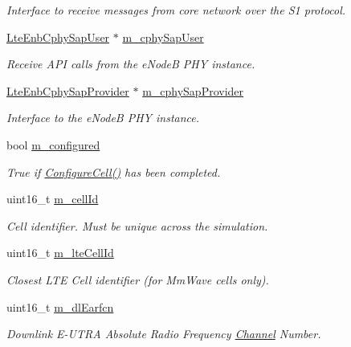 \begin{DoxyCompactItemize}
\begin{DoxyCompactList}\small\item\em Interface to receive messages from core network over the S1 protocol. \end{DoxyCompactList}\item 
\hyperlink{classns3_1_1LteEnbCphySapUser}{Lte\+Enb\+Cphy\+Sap\+User} $\ast$ \hyperlink{classns3_1_1LteEnbRrc_ad598b8b39b50e915d0e1069d4b0e5dcd}{m\+\_\+cphy\+Sap\+User}
\begin{DoxyCompactList}\small\item\em Receive A\+PI calls from the e\+NodeB P\+HY instance. \end{DoxyCompactList}\item 
\hyperlink{classns3_1_1LteEnbCphySapProvider}{Lte\+Enb\+Cphy\+Sap\+Provider} $\ast$ \hyperlink{classns3_1_1LteEnbRrc_ad0011468217726419587089658cd7352}{m\+\_\+cphy\+Sap\+Provider}
\begin{DoxyCompactList}\small\item\em Interface to the e\+NodeB P\+HY instance. \end{DoxyCompactList}\item 
bool \hyperlink{classns3_1_1LteEnbRrc_ac0a7069618bcc3daeb99c6aac864509e}{m\+\_\+configured}
\begin{DoxyCompactList}\small\item\em True if \hyperlink{classns3_1_1LteEnbRrc_a28baabf29624b37f55d017665be407c0}{Configure\+Cell()} has been completed. \end{DoxyCompactList}\item 
uint16\+\_\+t \hyperlink{classns3_1_1LteEnbRrc_a4ced331e168e6c1aeca0bb11be19b8c7}{m\+\_\+cell\+Id}
\begin{DoxyCompactList}\small\item\em Cell identifier. Must be unique across the simulation. \end{DoxyCompactList}\item 
uint16\+\_\+t \hyperlink{classns3_1_1LteEnbRrc_a23c61a4208f98c30a566e685ac932781}{m\+\_\+lte\+Cell\+Id}
\begin{DoxyCompactList}\small\item\em Closest L\+TE Cell identifier (for Mm\+Wave cells only). \end{DoxyCompactList}\item 
uint16\+\_\+t \hyperlink{classns3_1_1LteEnbRrc_aee99fe7a94ae8ef45983f580e36be04a}{m\+\_\+dl\+Earfcn}
\begin{DoxyCompactList}\small\item\em Downlink E-\/\+U\+T\+RA Absolute Radio Frequency \hyperlink{classns3_1_1Channel}{Channel} Number. \end{DoxyCompactList}\item 

\end{DoxyCompactItemize}
